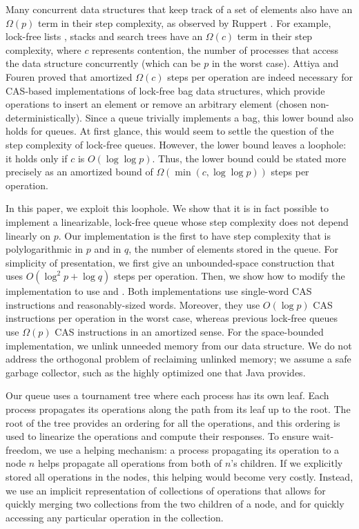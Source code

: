 Many concurrent data structures that keep track of a set of elements also have an $\Omega(p)$ term in their step complexity, as observed by Ruppert \cite{Rup16}.
For example, lock-free lists \cite{FR04,Sha15}, stacks \cite{Tre86} and search trees \cite{EFHR14} 
have an $\Omega(c)$ term in their step complexity, where $c$ represents contention,
the number of processes that access the data structure concurrently (which can be $p$ in the worst case).
Attiya and Fouren \cite{DBLP:conf/opodis/AttiyaF17} proved 
that amortized $\Omega(c)$ steps per operation are indeed necessary
for CAS-based implementations of lock-free bag data structures, which provide operations
to insert an element or remove an arbitrary element (chosen non-deterministically).
Since a queue trivially implements a bag, this lower bound also holds for queues.
At first glance, this would seem to settle the question of the step complexity of lock-free queues.
However, the lower bound leaves a loophole:  it holds only if $c$ is $O(\log\log p)$.
Thus, the lower bound could be stated more precisely as an amortized bound of $\Omega(\min(c,\log\log p))$ steps per operation.

In this paper, we exploit this loophole.  We show that it is in fact possible to implement a linearizable, lock-free queue
whose step complexity does not depend linearly on $p$.
Our implementation is the first to have step complexity that is polylogarithmic in $p$ and in $q$, the number of elements
stored in the queue.
For simplicity of presentation, we first give an unbounded-space construction that uses
$O(\log^2 p + \log q)$ steps per operation.
Then, we show how to modify the implementation to use 
 and .
Both implementations use single-word CAS instructions and reasonably-sized words.
Moreover, they use $O(\log p)$ CAS instructions per operation in the worst case, whereas previous
lock-free queues use 
$\Omega(p)$ CAS instructions in an amortized sense.
For the space-bounded implementation, we unlink unneeded memory from our data structure.
We do not address the orthogonal problem of reclaiming unlinked memory; we assume a safe
garbage collector, such as the highly optimized one that Java provides.

Our queue uses a tournament tree where each process has its own leaf.
Each process propagates its operations along the path from its leaf up to the root.
The root of the tree provides an ordering for all the operations,
and this ordering is used to linearize the operations and compute their responses.
To ensure wait-freedom, we use a helping mechanism:  a process propagating its operation 
to a node $n$ helps propagate all operations from both of $n$'s children.
If we explicitly stored all operations in the nodes, this helping would become very costly.
Instead, we use an implicit representation of collections
of operations that allows for quickly merging two collections from the two children of a node,
and for quickly accessing any particular operation in the collection.
